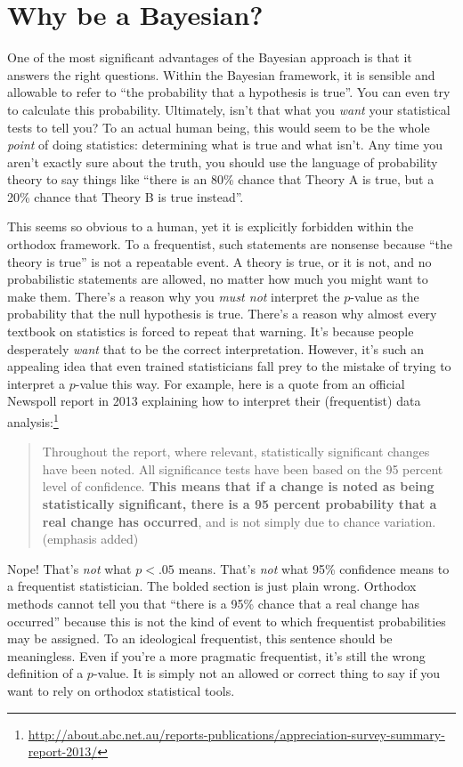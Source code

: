 \documentclass[
]{book}
\theoremstyle{definition}
\theoremstyle{definition}
\theoremstyle{definition}
\theoremstyle{definition}
\theoremstyle{remark}
\begin{document}
\hypertarget{whybayes}{%
\chapter{Why be a Bayesian?}\label{whybayes}}

One of the most significant advantages of the Bayesian approach is that it answers the right questions. Within the Bayesian framework, it is sensible and allowable to refer to ``the probability that a hypothesis is true''. You can even try to calculate this probability. Ultimately, isn't that what you \emph{want} your statistical tests to tell you? To an actual human being, this would seem to be the whole \emph{point} of doing statistics: determining what is true and what isn't. Any time you aren't exactly sure about the truth, you should use the language of probability theory to say things like ``there is an 80\% chance that Theory A is true, but a 20\% chance that Theory B is true instead''.

This seems so obvious to a human, yet it is explicitly forbidden within the orthodox framework. To a frequentist, such statements are nonsense because ``the theory is true'' is not a repeatable event. A theory is true, or it is not, and no probabilistic statements are allowed, no matter how much you might want to make them. There's a reason why you \emph{must not} interpret the \(p\)-value as the probability that the null hypothesis is true. There's a reason why almost every textbook on statistics is forced to repeat that warning. It's because people desperately \emph{want} that to be the correct interpretation. However, it's such an appealing idea that even trained statisticians fall prey to the mistake of trying to interpret a \(p\)-value this way. For example, here is a quote from an official Newspoll report in 2013 explaining how to interpret their (frequentist) data analysis:\footnote{\url{http://about.abc.net.au/reports-publications/appreciation-survey-summary-report-2013/}}

\begin{quote}
Throughout the report, where relevant, statistically significant changes have been noted. All significance tests have been based on the 95 percent level of confidence. \textbf{This means that if a change is noted as being statistically significant, there is a 95 percent probability that a real change has occurred}, and is not simply due to chance variation. (emphasis added)
\end{quote}

Nope! That's \emph{not} what \(p<.05\) means. That's \emph{not} what 95\% confidence means to a frequentist statistician. The bolded section is just plain wrong. Orthodox methods cannot tell you that ``there is a 95\% chance that a real change has occurred'' because this is not the kind of event to which frequentist probabilities may be assigned. To an ideological frequentist, this sentence should be meaningless. Even if you're a more pragmatic frequentist, it's still the wrong definition of a \(p\)-value. It is simply not an allowed or correct thing to say if you want to rely on orthodox statistical tools.
\end{document}
